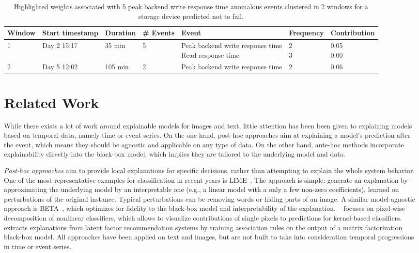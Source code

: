 \documentclass[letterpaper]{article} %
\begin{document}
\begin{table}
\centering
\begin{tabular}{| l | l | l | l | l | l | l |}
\hline
\textbf{Window} & \textbf{Start timestamp} & \textbf{Duration} & \textbf{\# Events} &\textbf{Event} & \textbf{Frequency} & \textbf{Contribution} \\
\hline
1 & Day 2 15:17 & 35 min & 5 & \shortstack[l]{Peak backend write response time\\Read response time} & \shortstack{2\\3} & \shortstack{0.05\\0.00} \\
\hline
2 & Day 5 12:02& 105 min &2& Peak backend write response time & 2 & 0.06 \\
\hline
\end{tabular}
\vspace{-1.45mm}
\caption{Highlighted weights associated with 5 peak backend write response time anomalous events clustered in 2 windows for a storage device predicted not to fail.}
\label{nofailnice}
\end{table}



\section{Related Work}

While there exists a lot of work around explainable models for images and text, little attention has been been given to explaining models based on temporal data, namely time or event series. On the one hand, post-hoc approaches aim at explaining a model's prediction after the event, which means they should be agnostic and applicable on any type of data. On the other hand, ante-hoc methods incorporate explainability directly into the black-box model, which implies they are tailored to the underlying model and data.

\vspace{-1.58mm}
\vspace{-3.15mm}
\textit{Post-hoc approaches} aim to provide local explanations for specific decisions, rather than attempting to explain the whole system behavior. One of the most representative examples for classification in recent years is LIME~\cite{lime}. The approach is simple: generate an explanation by approximating the underlying model by an interpretable one (e.g., a linear model with a only a few non-zero coefficients), learned on perturbations of the original instance. Typical perturbations can be removing words or hiding parts of an image. A similar model-agnostic approach is BETA~\cite{approximations}, which optimizes for fidelity to the black-box model and interpretability of the explanation. ~\cite{layerwise} focuses on pixel-wise decomposition of nonlinear classifiers, which allows to visualize contributions of single pixels to predictions for kernel-based classifiers. ~\cite{mining} extracts explanations from latent factor recommendation systems by training association rules on the output of a matrix factorization black-box model. All approaches have been applied on text and images, but are not built to take into consideration temporal progressions in time or event series.
\end{document}
